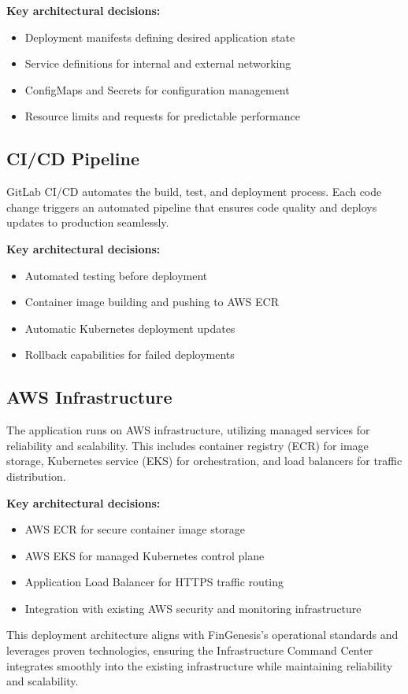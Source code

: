 \textbf{Key architectural decisions:}
\begin{itemize}
    \item Deployment manifests defining desired application state
    \item Service definitions for internal and external networking
    \item ConfigMaps and Secrets for configuration management
    \item Resource limits and requests for predictable performance
\end{itemize}

\subsection{CI/CD Pipeline}

GitLab CI/CD automates the build, test, and deployment process. Each code change triggers an automated pipeline that ensures code quality and deploys updates to production seamlessly.

\textbf{Key architectural decisions:}
\begin{itemize}
    \item Automated testing before deployment
    \item Container image building and pushing to AWS ECR
    \item Automatic Kubernetes deployment updates
    \item Rollback capabilities for failed deployments
\end{itemize}

\subsection{AWS Infrastructure}

The application runs on AWS infrastructure, utilizing managed services for reliability and scalability. This includes container registry (ECR) for image storage, Kubernetes service (EKS) for orchestration, and load balancers for traffic distribution.

\textbf{Key architectural decisions:}
\begin{itemize}
    \item AWS ECR for secure container image storage
    \item AWS EKS for managed Kubernetes control plane
    \item Application Load Balancer for HTTPS traffic routing
    \item Integration with existing AWS security and monitoring infrastructure
\end{itemize}

This deployment architecture aligns with FinGenesis's operational standards and leverages proven technologies, ensuring the Infrastructure Command Center integrates smoothly into the existing infrastructure while maintaining reliability and scalability.